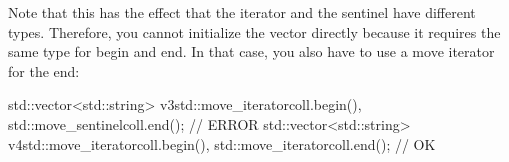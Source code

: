 Note that this has the effect that the iterator and the sentinel have different types. Therefore, you cannot initialize the vector directly because it requires the same type for begin and end. In that case, you also have to use a move iterator for the end:

\begin{cpp}
std::vector<std::string> v3{std::move_iterator{coll.begin()},
							std::move_sentinel{coll.end()}}; // ERROR
std::vector<std::string> v4{std::move_iterator{coll.begin()},
							std::move_iterator{coll.end()}}; // OK
\end{cpp}















